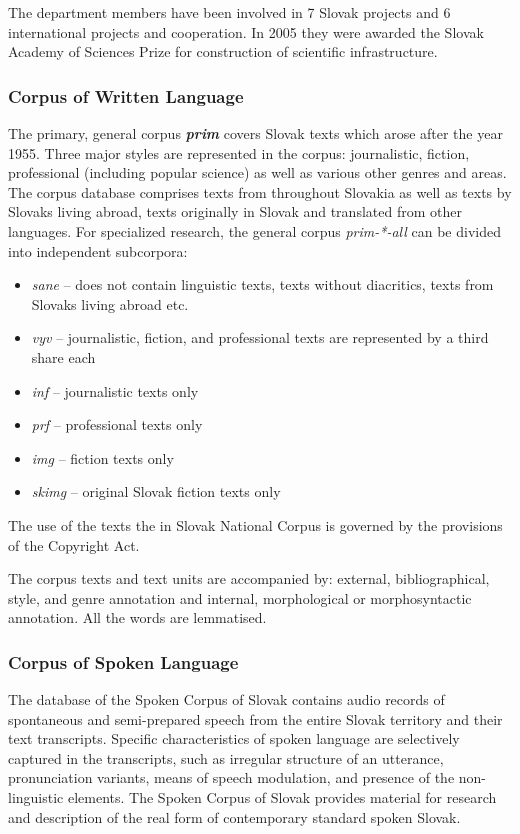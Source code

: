 \begin{multicols}{2}
The department
members have been involved in 7 Slovak projects and 6 international
projects and cooperation. In 2005 they were awarded the Slovak Academy
of Sciences Prize for construction of scientific infrastructure. 

\subsubsection{Corpus of Written Language}
The primary, general corpus {\bf\emph{prim}} covers Slovak texts
which arose after the year 1955. Three major styles are represented in the
corpus: journalistic, fiction, professional (including popular science) as well as
various other genres and areas. The corpus database comprises texts from
throughout Slovakia as well as texts by Slovaks living abroad, texts originally
in Slovak and translated from other languages. For specialized research, the
general corpus \emph{prim-*-all} can be divided into independent subcorpora:

\begin{itemize}
\item \emph{sane} – does not contain linguistic texts, texts without diacritics, texts from Slovaks living abroad etc.
\item \emph{vyv} – journalistic, fiction, and professional texts are represented by a third share each
\item \emph{inf} – journalistic texts only
\item \emph{prf} – professional texts only
\item \emph{img} – fiction texts only
\item \emph{skimg} – original Slovak fiction texts only
\end{itemize}

The use of the texts the in Slovak National Corpus is governed by the provisions of the Copyright Act.

The corpus texts and text units are accompanied by: external,
bibliographical, style, and genre
annotation\cite{f12} and internal,
morphological or morphosyntactic
annotation\cite{f13}. All the words
are lemmatised.

\subsubsection{Corpus of Spoken Language}
The database of the Spoken Corpus of
Slovak\cite{f14} contains audio records
of spontaneous and semi-prepared speech from the entire Slovak territory and
their text transcripts. Specific characteristics of spoken language are
selectively captured in the transcripts, such as irregular structure of an
utterance, pronunciation variants, means of speech modulation, and presence of
the non-linguistic elements. The Spoken Corpus of Slovak provides material for
research and description of the real form of contemporary standard spoken
Slovak.


\end{multicols}
